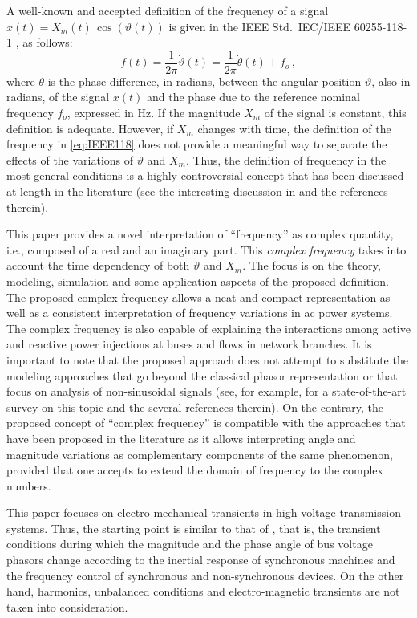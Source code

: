 \documentclass[journal, twocolumn, letter]{IEEEtran}
\begin{document}
A well-known and accepted definition of the frequency of a signal
$x(t) = X_m(t) \, \cos(\vartheta(t))$ is given in the IEEE
Std.~IEC/IEEE 60255-118-1 \cite{IEEE118}, as follows:
\begin{equation}
  \label{eq:IEEE118}
  f(t) = \frac{1}{2\pi} \dot{\vartheta}(t) = 
  \frac{1}{2\pi} \dot{\theta}(t) + f_o \, ,
\end{equation}
where $\theta$ is the phase difference, in radians, between the
angular position $\vartheta$, also in radians, of the signal $x(t)$
and the phase due to the reference nominal frequency $f_o$, expressed
in Hz.  If the magnitude $X_m$ of the signal is constant, this
definition is adequate.  However, if $X_m$ changes with time, the
definition of the frequency in \eqref{eq:IEEE118} does not provide a
meaningful way to separate the effects of the variations of
$\vartheta$ and $X_m$.  Thus, the definition of frequency in the most
general conditions is a highly controversial concept that has been
discussed at length in the literature (see the interesting discussion
in \cite{8586583} and the references therein).  

This paper provides a novel interpretation of ``frequency'' as complex
quantity, i.e., composed of a real and an imaginary part.  This
\textit{complex frequency} takes into account the time dependency of
both $\vartheta$ and $X_m$.
The focus is on the theory, modeling, simulation and some application
aspects of the proposed definition.  The proposed complex frequency
allows a neat and compact representation as well as a consistent
interpretation of frequency variations in ac power systems.  The
complex frequency is also capable of explaining the interactions among
active and reactive power injections at buses and flows in network
branches.  It is important to note that the proposed approach does not
attempt to substitute the modeling approaches that go beyond the
classical phasor representation or that focus on analysis of
non-sinusoidal signals (see, for example, \cite{Paolone:2020} for a
state-of-the-art survey on this topic and the several references
therein).  On the contrary, the proposed concept of ``complex
frequency'' is compatible with the approaches that have been proposed
in the literature as it allows interpreting angle and magnitude
variations as complementary components of the same phenomenon,
provided that one accepts to extend the domain of frequency to the
complex numbers.  

This paper focuses on electro-mechanical transients in high-voltage
transmission systems.   Thus, the starting point is
similar to that of \cite{6112197, Divider, 7936594, Maker1}, that is,
the transient conditions during which the magnitude and the phase
angle of bus voltage phasors change according to the inertial response
of synchronous machines and the frequency control of synchronous and
non-synchronous devices.  On the other hand, harmonics, unbalanced
conditions and electro-magnetic transients are not taken into
consideration. 
\end{document}
